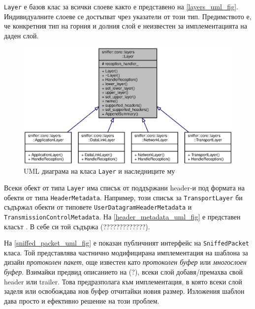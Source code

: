 \documentclass[12pt,a4paper,oneside]{book}
\begin{document}
\texttt{Layer} е базов клас за всички слоеве както е представено на
\autoref{layers_uml_fig}.  Индивидуалните слоеве се достъпват чрез указатели
от този тип. Предимството е, че конкретния тип на горния и долния слой е
неизвестен за имплементацията на даден слой.

\begin{figure}[h!]
  \centering
  \includegraphics[scale=.7]{figures/layers_uml.eps}
  \caption{UML диаграма на класа \texttt{Layer} и наследниците му}
  \label{layers_uml_fig}
\end{figure}

Всеки обект от типа \texttt{Layer} има списък от поддържани header-и под формата
на обекти от типа \texttt{HeaderMetadata}. Например, този списък за
\texttt{TransportLayer} би съдържал обекти от типовете
\texttt{UserDatagramHeaderMetadata} и \texttt{TransmissionControlMetadata}.
На \autoref{header_metadata_uml_fig} е представен класът .
В себе си той съдържа (?????????????).

На \autoref{sniffed_packet_uml_fig} е показан публичният интерфейс на
\texttt{SniffedPacket} класа. Той представлява частнично модифицирана
имплементация на шаблона за дизайн \textit{протоколен пакет}, още известен като
\textit{протоколен буфер} или \textit{многослоен буфер}. Взимайки предвид
описанието на (?), всеки слой добавя/премахва свой header или trailer.
Това предразполага към имплементация, в която всеки слой заделя или освобождава
нов буфер отчитайки новия размер. Изложения шаблон дава просто и ефективно
решение на този проблем.
\end{document}
